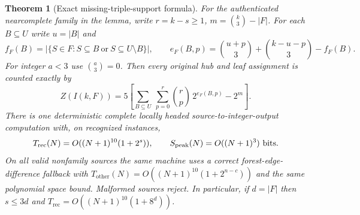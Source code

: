 \documentclass[11pt]{article}
\newtheorem{theorem}{Theorem}
\begin{document}
\begin{theorem}[Exact missing-triple-support formula]
For the authenticated nearcomplete family in the lemma,
write $r=k-s\ge1$, $m=\binom{k}{3}-|F|$.
For each $B\subseteq U$ write $u=|B|$ and
\[
f_F(B)=|\{S\in F:S\subseteq B
       \ \text{or}\ S\subseteq U\setminus B\}|,
\qquad
e_F(B,p)=\binom{u+p}{3}+\binom{k-u-p}{3}-f_F(B).
\]
For integer $a<3$ use $\binom a3=0$.
Then \emph{every original hub and leaf assignment}
is counted exactly by
\[
\boxed{\displaystyle
Z(I(k,F))=
5\left[
  \sum_{B\subseteq U}\ \sum_{p=0}^{r}
  \binom rp\,2^{e_F(B,p)}-2^m
 \right].}
\]
There is one deterministic complete locally headed
source-to-integer-output computation with, on recognized instances,
\[
T_{\mathrm{rec}}(N)=O((N+1)^{10}(1+2^s)),
\qquad S_{\mathrm{peak}}(N)=O((N+1)^3)\ {\rm bits}.
\]
On all valid nonfamily sources the same machine uses a
correct forest-edge-difference fallback with
$T_{\mathrm{other}}(N)=O((N+1)^{10}(1+2^{n-c}))$ and the
\emph{same} polynomial space bound. Malformed sources reject.
In particular, if $d=|F|$ then $s\le3d$ and
$T_{\mathrm{rec}}=O((N+1)^{10}(1+8^d))$.
\end{theorem}
\end{document}
